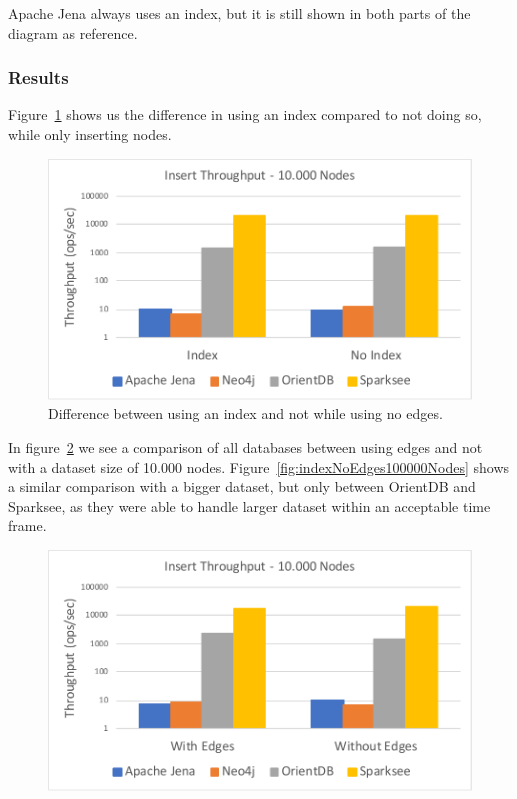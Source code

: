 Apache Jena always uses an index,
but it is still shown in both parts of the diagram as reference.

\subsubsection{Results}
Figure~\ref{fig:noEdges} shows us the difference in using an index compared to not doing so,
while only inserting nodes.

\begin{figure}[h!]
  \centering
  \includegraphics[width=.75\textwidth]{images/throughput/noEdges}
  \caption{Difference between using an index and not while using no edges.}
  \label{fig:noEdges}
\end{figure}

In figure~\ref{fig:indexNoEdges10000Nodes} we see a comparison of all databases between using edges and not with a dataset size of 10.000 nodes.
Figure~\ref{fig:indexNoEdges100000Nodes} shows a similar comparison with a bigger dataset,
but only between OrientDB and Sparksee,
as they were able to handle larger dataset within an acceptable time frame.

\begin{figure}[h!]
  \centering
  \includegraphics[width=.75\textwidth]{images/throughput/indexNoEdges10000Nodes}
  \label{fig:indexNoEdges10000Nodes}
\end{figure}

